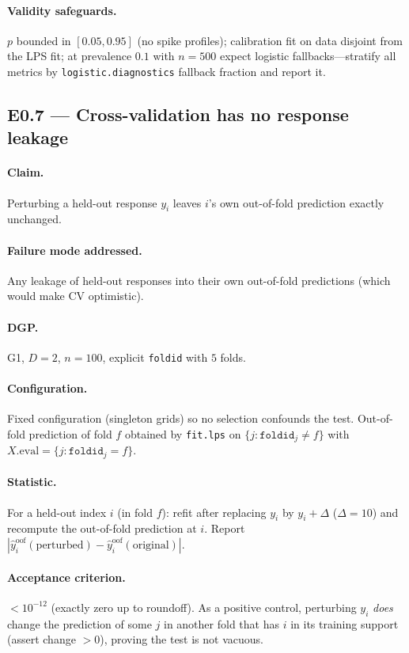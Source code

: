 \documentclass[11pt]{article}
\newcommand{\code}[1]{\texttt{#1}}
\begin{document}
\paragraph{Validity safeguards.} $p$ bounded in $[0.05,0.95]$ (no spike profiles); calibration
fit on data disjoint from the LPS fit; at prevalence $0.1$ with $n=500$ expect logistic
fallbacks—stratify all metrics by \code{logistic.diagnostics} fallback fraction and report it.

\subsection{E0.7 — Cross-validation has no response leakage}

\paragraph{Claim.} Perturbing a held-out response $y_i$ leaves $i$'s own out-of-fold
prediction exactly unchanged.

\paragraph{Failure mode addressed.} Any leakage of held-out responses into their own
out-of-fold predictions (which would make CV optimistic).

\paragraph{DGP.} G1, $D=2$, $n=100$, explicit \code{foldid} with $5$ folds.

\paragraph{Configuration.} Fixed configuration (singleton grids) so no selection confounds the
test. Out-of-fold prediction of fold $f$ obtained by \code{fit.lps} on
$\{j:\code{foldid}_j\ne f\}$ with $X.\mathrm{eval}=\{j:\code{foldid}_j=f\}$.

\paragraph{Statistic.} For a held-out index $i$ (in fold $f$): refit after replacing $y_i$ by
$y_i+\Delta$ ($\Delta=10$) and recompute the out-of-fold prediction at $i$. Report
$|\hat y^{\mathrm{oof}}_i(\text{perturbed})-\hat y^{\mathrm{oof}}_i(\text{original})|$.

\paragraph{Acceptance criterion.} $<10^{-12}$ (exactly zero up to roundoff). As a positive
control, perturbing $y_i$ \emph{does} change the prediction of some $j$ in another fold that has
$i$ in its training support (assert change $>0$), proving the test is not vacuous.
\end{document}
